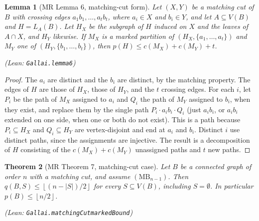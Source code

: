 \documentclass[11pt]{amsart}
\newtheorem{theorem}{Theorem}[section]
\newtheorem{lemma}[theorem]{Lemma}
\theoremstyle{definition}
\theoremstyle{remark}
\renewcommand{\_}{\oldunderscore\allowbreak}
\newcommand{\leanst}[1]{\par{\raggedright\small\textup{(Lean: \texttt{#1})}\par}}
\newcommand{\fl}[1]{\left\lfloor #1\right\rfloor}
\newcommand{\MBU}{\mathrm{MB}}
\begin{document}
\begin{lemma}[MR Lemma 6, matching-cut form]\label{lem:lemma6}
Let $(X,Y)$ be a matching cut of $B$ with crossing edges $a_1b_1,\dots,a_tb_t$, where $a_i\in X$ and
$b_i\in Y$, and let $A\subseteq V(B)$ and $H=L_A(B)$. Let $H_X$ be the subgraph of $H$ induced on $X$
and the leaves of $A\cap X$, and $H_Y$ likewise. If $M_X$ is a marked partition of
$(H_X,\{a_1,\dots,a_t\})$ and $M_Y$ one of $(H_Y,\{b_1,\dots,b_t\})$, then
$p(H)\le c(M_X)+c(M_Y)+t$.
\leanst{Gallai.lemma6}
\end{lemma}

\begin{proof}
The $a_i$ are distinct and the $b_i$ are distinct, by the matching property. The edges of $H$ are
those of $H_X$, those of $H_Y$, and the $t$ crossing edges. For each $i$, let $P_i$ be the path of
$M_X$ assigned to $a_i$ and $Q_i$ the path of $M_Y$ assigned to $b_i$, when they exist, and replace
them by the single path $P_i\cdot a_ib_i\cdot Q_i$ (just $a_ib_i$, or $a_ib_i$ extended on one side,
when one or both do not exist). This is a path because $P_i\subseteq H_X$ and $Q_i\subseteq H_Y$ are
vertex-disjoint and end at $a_i$ and $b_i$. Distinct $i$ use distinct paths, since the assignments are
injective. The result is a decomposition of $H$ consisting of the $c(M_X)+c(M_Y)$ unassigned paths and
$t$ new paths.
\end{proof}

\begin{theorem}[MR Theorem 7, matching-cut case]\label{thm:mc}
Let $B$ be a connected graph of order $n$ with a matching cut, and assume $(\MBU_{n-1})$. Then
$q(B,S)\le\fl{(n-|S|)/2}$ for every $S\subseteq V(B)$, including $S=\emptyset$. In particular
$p(B)\le\fl{n/2}$.
\leanst{Gallai.matchingCut\_markedBound}
\end{theorem}
\end{document}
